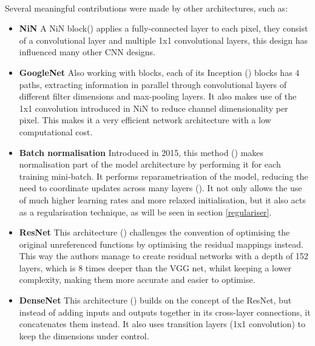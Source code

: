 \paragraph{}
Several meaningful contributions were made by other architectures, such as:
\begin{itemize}
    \item \textbf{\gls{NiN}} A \gls{NiN} block(\cite{lin2014network}) applies a fully-connected layer to each pixel, they consist of a convolutional layer and multiple 1x1 convolutional layers, this design has influenced many other \gls{CNN} designs.
 
    \item \textbf{GoogleNet } Also working with blocks, each of its Inception (\cite{7298594}) blocks has 4 paths, extracting information in parallel through convolutional layers of different filter dimensions and max-pooling layers. It also makes use of the 1x1 convolution introduced in \gls{NiN} to reduce channel dimensionality per pixel. This makes it a very efficient network architecture with a low computational cost.
    
    \item \textbf{Batch normalisation} Introduced in 2015, this method (\cite{ioffe2015batch}) makes normalisation part of the model architecture by performing it for each training mini-batch. It performs reparametrisation of the model, reducing the need to coordinate updates across many layers (\cite{GoodBengCour16}). It not only allows the use of much higher learning rates and more relaxed initialisation, but it also acts as a regularisation technique, as will be seen in section \ref{regulariser}.
    
    \item \textbf{ResNet} This architecture (\cite{he2015deep}) challenges the convention of optimising the original unreferenced functions by optimising the residual mappings instead. This way the authors manage to create residual networks with a depth of 152 layers, which is $8$ times deeper than the VGG net, whilst keeping a lower complexity, making them more accurate and easier to optimise. 
    \item \textbf{DenseNet} This architecture (\cite{8099726}) builds on the concept of the ResNet, but instead of adding inputs and outputs together in its cross-layer connections, it concatenates them instead. It also uses transition layers (1x1 convolution) to keep the dimensions under control.

\end{itemize}

